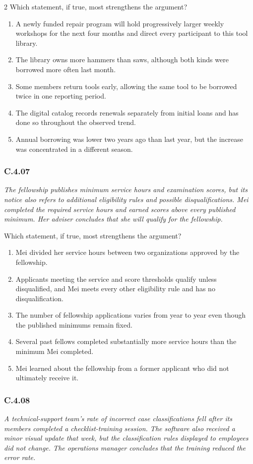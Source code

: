 \documentclass[10pt]{extarticle}
\newcommand{\choice}[1]{\item #1}
\newcommand{\bankitem}[1]{\subsubsection*{#1}}
\begin{document}
\begin{multicols}{2}
Which statement, if true, most strengthens the argument?
\begin{enumerate}[label=(\alph*)]
  \choice{A newly funded repair program will hold progressively larger weekly workshops for the next four months and direct every participant to this tool library.}
  \choice{The library owns more hammers than saws, although both kinds were borrowed more often last month.}
  \choice{Some members return tools early, allowing the same tool to be borrowed twice in one reporting period.}
  \choice{The digital catalog records renewals separately from initial loans and has done so throughout the observed trend.}
  \choice{Annual borrowing was lower two years ago than last year, but the increase was concentrated in a different season.}
\end{enumerate}
\bankitem{C.4.07}
\emph{The fellowship publishes minimum service hours and examination scores, but its notice also refers to additional eligibility rules and possible disqualifications. Mei completed the required service hours and earned scores above every published minimum. Her adviser concludes that she will qualify for the fellowship.}

Which statement, if true, most strengthens the argument?
\begin{enumerate}[label=(\alph*)]
  \choice{Mei divided her service hours between two organizations approved by the fellowship.}
  \choice{Applicants meeting the service and score thresholds qualify unless disqualified, and Mei meets every other eligibility rule and has no disqualification.}
  \choice{The number of fellowship applications varies from year to year even though the published minimums remain fixed.}
  \choice{Several past fellows completed substantially more service hours than the minimum Mei completed.}
  \choice{Mei learned about the fellowship from a former applicant who did not ultimately receive it.}
\end{enumerate}
\bankitem{C.4.08}
\emph{A technical-support team's rate of incorrect case classifications fell after its members completed a checklist-training session. The software also received a minor visual update that week, but the classification rules displayed to employees did not change. The operations manager concludes that the training reduced the error rate.}


\end{multicols}
\end{document}
